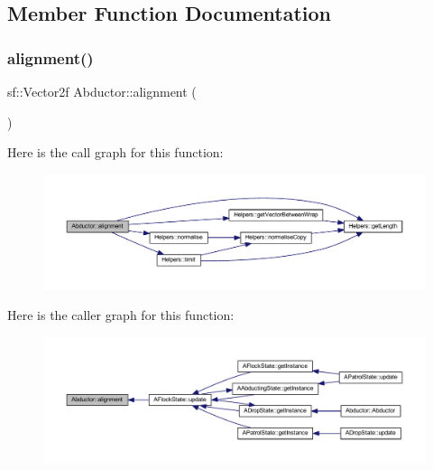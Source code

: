 \subsection{Member Function Documentation}
\mbox{\label{class_abductor_ac8ef27110672980a395fa9ba68299337}} 
\subsubsection{\texorpdfstring{alignment()}{alignment()}}
{\footnotesize\ttfamily sf\+::\+Vector2f Abductor\+::alignment (\begin{DoxyParamCaption}{ }\end{DoxyParamCaption})}

Here is the call graph for this function\+:
\nopagebreak
\begin{figure}[H]
\begin{center}
\leavevmode
\includegraphics[width=350pt]{class_abductor_ac8ef27110672980a395fa9ba68299337_cgraph}
\end{center}
\end{figure}
Here is the caller graph for this function\+:
\nopagebreak
\begin{figure}[H]
\begin{center}
\leavevmode
\includegraphics[width=350pt]{class_abductor_ac8ef27110672980a395fa9ba68299337_icgraph}
\end{center}
\end{figure}
\mbox{\label{class_abductor_a1a0d06816d3572995a0ce1e0426c6d68}} 
